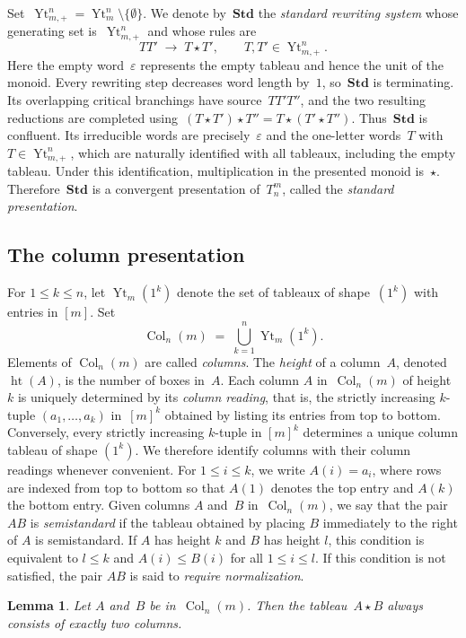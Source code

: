 \documentclass[a4paper, twoside, 11pt, english]{article}
\theoremstyle{plain}
\newtheorem{lemma}[subsubsection]{Lemma}
\theoremstyle{definition}
\newcommand{\fl}{\rightarrow}
\DeclareMathOperator{\YoungT}{Yt}
\DeclareMathOperator{\col}{Col}
\DeclareMathOperator{\height}{ht}
\newcommand{\Std}{\mathbf{Std}}
\begin{document}
Set~$\YoungT_{m,+}^n=\YoungT_m^n\setminus\{\emptyset\}$.
We denote by~$\Std$ the \emph{standard rewriting system} whose generating
set is~$\YoungT_{m,+}^n$ and whose rules are
\[
TT'\;\fl\;T\star T',
\qquad
T,T'\in\YoungT_{m,+}^n.
\]
Here the empty word~$\varepsilon$ represents the empty tableau and hence the
unit of the monoid.
Every rewriting step decreases word length by~$1$, so~$\Std$ is terminating.
Its overlapping critical branchings have source~$TT'T''$, and the two
resulting reductions are completed using~$(T\star T')\star T''=T\star(T'\star T'')$.
Thus~$\Std$ is confluent. Its irreducible words are precisely~$\varepsilon$ and the one-letter words~$T$ with
$T\in\YoungT_{m,+}^n$, which are naturally identified with all tableaux,
including the empty tableau. Under this identification, multiplication in
the presented monoid is~$\star$. Therefore~$\Std$ is a convergent
presentation of~$T_n^m$, called the \emph{standard presentation}.



\subsection{The column presentation}
\label{SS:ColumnPresentation}
For $1 \le k \le n$, let $\YoungT_m(1^k)$ denote the set of 
tableaux of shape~$(1^k)$ with entries in $[m]$.
Set
\[
\col_n(m) \;=\; \bigcup_{k=1}^n \YoungT_m(1^k).
\]
Elements of $\col_n(m)$ are called \emph{columns}.
The \emph{height} of a column~$A$, denoted~$\height(A)$, is the number of boxes in~$A$.
Each column $A$ in~$\col_n(m)$ of height $k$ is uniquely determined by its \emph{column reading}, that is, the strictly increasing $k$-tuple
$(a_1,\dots,a_k)$ in~$[m]^k$ obtained by listing its entries from top to bottom.
Conversely, every strictly increasing $k$-tuple in $[m]^k$ determines a unique column tableau of shape $(1^k)$.
We therefore identify columns with their column readings whenever convenient.
For $1\le i\le k$, we write $A(i)=a_i$, where rows are indexed from top to
bottom so that $A(1)$ denotes the top entry and $A(k)$ the bottom entry.
Given columns $A$ and~$B$ in~$\col_n(m)$, we say that the pair $AB$ is
\emph{semistandard} if the tableau obtained by placing $B$ immediately to the
right of $A$ is semistandard.
If $A$ has height $k$ and $B$ has height $l$, this condition is equivalent to
$l\le k$ and $A(i)\le B(i)$ for all $1\le i\le l$.
If this condition is not satisfied, the pair $AB$ is said to
\emph{require normalization}.


\begin{lemma}
\label{L:TwocolumnsLemmata}
Let $A$ and~$B$ be in~$\col_n(m)$.
Then the tableau~$A\star B$ always consists of exactly two columns.
\end{lemma}
\end{document}
